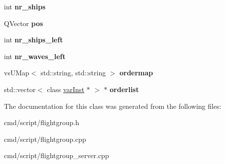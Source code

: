 \begin{DoxyCompactItemize}
\item 
int {\bfseries nr\+\_\+ships}\hypertarget{classFlightgroup_a2e2bbe59e023e9fb935278dab4cea6bc}{}\label{classFlightgroup_a2e2bbe59e023e9fb935278dab4cea6bc}

\item 
Q\+Vector {\bfseries pos}\hypertarget{classFlightgroup_a1ab0bad879f6c8770fd3fb3d8f2ca7de}{}\label{classFlightgroup_a1ab0bad879f6c8770fd3fb3d8f2ca7de}

\item 
int {\bfseries nr\+\_\+ships\+\_\+left}\hypertarget{classFlightgroup_aca2afe6d6589d330aa9ef239ac0054e2}{}\label{classFlightgroup_aca2afe6d6589d330aa9ef239ac0054e2}

\item 
int {\bfseries nr\+\_\+waves\+\_\+left}\hypertarget{classFlightgroup_a8c8553e6c714d636c5e10fcaf297d87b}{}\label{classFlightgroup_a8c8553e6c714d636c5e10fcaf297d87b}

\item 
vs\+U\+Map$<$ std\+::string, std\+::string $>$ {\bfseries ordermap}\hypertarget{classFlightgroup_a793830005c72ea36487fc2bc437dce95}{}\label{classFlightgroup_a793830005c72ea36487fc2bc437dce95}

\item 
std\+::vector$<$ class \hyperlink{classvarInst}{var\+Inst} $\ast$ $>$ $\ast$ {\bfseries orderlist}\hypertarget{classFlightgroup_a290c580e17d6165bc4a498dafa7087a6}{}\label{classFlightgroup_a290c580e17d6165bc4a498dafa7087a6}

\end{DoxyCompactItemize}


The documentation for this class was generated from the following files\+:\begin{DoxyCompactItemize}
\item 
cmd/script/flightgroup.\+h\item 
cmd/script/flightgroup.\+cpp\item 
cmd/script/flightgroup\+\_\+server.\+cpp\end{DoxyCompactItemize}
